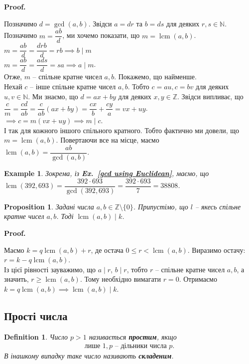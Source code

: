 \documentclass[a4paper, 14pt]{extarticle}
\makeatletter
\theoremstyle{theoremdd}
\theoremstyle{theoremdd}
\newtheorem{definition}[theorem]{Definition}
\theoremstyle{theoremdd}
\theoremstyle{theoremdd}
\newtheorem{example}[theorem]{Example}
\theoremstyle{theoremdd}
\newtheorem{proposition}[theorem]{Proposition}
\theoremstyle{theoremdd}
\theoremstyle{theoremdd}
\theoremstyle{theoremdd}
\def\qed{$\blacksquare$}
\renewenvironment{proof}[1][Proof.\\]{\par
\pushQED{\hfill \qed}%
\normalfont \topsep6\p@\@plus6\p@\relax
\trivlist
\item\relax
{\bfseries
#1\@addpunct{.}}\hspace\labelsep\ignorespaces
}{%
\popQED\endtrivlist\@endpefalse
}
\DeclareMathOperator{\lcm}{lcm}
\newcommand\exref[1]{\textbf{Ex.~\ref{#1}}}
\makeatother
\begin{document}
\begin{proof}
Позначимо $d = \gcd(a,b)$. Звідси $a=dr$ та $b=ds$ для деяких $r,s \in \mathbb{N}$.\\
Позначимо $m = \dfrac{ab}{d}$, ми хочемо показати, що $m = \lcm(a,b)$.\\
$m = \dfrac{ab}{d} = \dfrac{drb}{d} = rb \implies b \mid m$\\
$m = \dfrac{ab}{d} = \dfrac{ads}{d} = sa \implies a \mid m$.\\
Отже, $m$ -- спільне кратне чисел $a,b$. Покажемо, що найменше.\\
Нехай $c$ -- інше спільне кратне чисел $a,b$. Тобто $c = au, c =bv$ для деяких $u,v \in \mathbb{N}$. Ми знаємо, що $d = ax+by$ для деяких $x,y \in \mathbb{Z}$. Звідси випливає, що\\
$\dfrac{c}{m} = \dfrac{cd}{ab} = \dfrac{c}{ab}(ax+by) = \dfrac{cx}{b} + \dfrac{cy}{a} = vx+uy$.\\
$\implies c = m(vx+uy) \implies m \mid c$. \\
І так для кожного іншого спільного кратного. Тобто фактично ми довели, що $m = \lcm(a,b)$. Повертаючи все на місце, маємо\\
$\lcm(a,b) = \dfrac{ab}{\gcd(a,b)}$.
\end{proof}

\begin{example}
Зокрема, із \exref{gcd using Euclidean}, маємо, що \\
$\lcm(392,693) = \dfrac{392 \cdot 693}{\gcd(392,693)} = \dfrac{392 \cdot 693}{7} = 38808$.
\end{example}

\begin{proposition}
Задані числа $a,b \in \mathbb{Z} \setminus \{0\}$. Припустімо, що $l$ -- якесь спільне кратне чисел $a,b$. Тоді $\lcm(a,b) \mid k$.
\end{proposition}

\begin{proof}
Маємо $k = q \lcm(a,b) + r$, де остача $0 \leq r < \lcm(a,b)$. Виразимо остачу:\\
$r = k - q \lcm(a,b)$.\\
Із цієї рівності зауважимо, що $a \mid r$, $b \mid r$, тобто $r$ -- спільне кратне чисел $a,b$, а значить, $r \geq \lcm(a,b)$. Тому необхідно вимагати $r = 0$. Отримаємо $k = q \lcm(a,b) \implies \lcm(a,b) \mid k$.
\end{proof}

\subsection{Прості числа}
\begin{definition}
Число $p > 1$ називається \textbf{простим}, якщо
\begin{align*}
\text{лише $1,p$ -- дільники числа $p$.}
\end{align*}
В інашкому випадку таке число називають \textbf{складеним}.
\end{definition}
\end{document}
